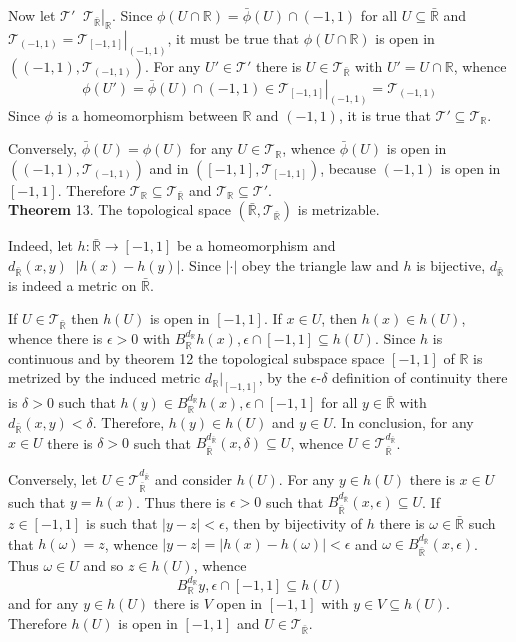 \documentclass[a4paper]{article}
\newcommand{\clo}[1]{\left [ #1 \right ]}
\newcommand{\brac}[1]{\left ( #1 \right )}
\newcommand{\induc}[1]{\left . #1 \right \vert}
\newcommand{\abs}[1]{\left | #1 \right |}
\newcommand{\Rbar}{{\bar{\mathbb{R}}}}
\newcommand{\Real}{\mathbb{R}}
\newcommand{\Tcal}{\mathcal{T}}
\newcommand{\defn}{\mathop{\overset{\Delta}{=}}\nolimits}
\begin{document}
Now let $\Tcal'\defn \induc{\Tcal_\Rbar}_\Real$. Since $\phi\brac{U\cap\Real}=\bar{\phi}\brac{U}\cap\brac{-1,1}$ for all $U\subseteq \Rbar$ and $\Tcal_{\brac{-1,1}}=\induc{\Tcal_{\clo{-1,1}}}_{\brac{-1,1}}$, it must be true that $\phi\brac{U\cap\Real}$ is open in $\brac{\brac{-1,1}, \Tcal_{\brac{-1,1}}}$. For any $U'\in\Tcal'$ there is $U\in \Tcal_\Rbar$ with $U'=U\cap \Real$, whence \[\phi\brac{U'}=\bar{\phi}\brac{U}\cap \brac{-1,1}\in\induc{\Tcal_{\clo{-1,1}}}_{\brac{-1,1}}=\Tcal_{\brac{-1,1}}\] Since $\phi$ is a homeomorphism between $\Real$ and $\brac{-1,1}$, it is true that $\Tcal'\subseteq \Tcal_\Real$.

Conversely, $\bar{\phi}\brac{U}=\phi\brac{U}$ for any $U\in\Tcal_\Real$, whence $\bar{\phi}\brac{U}$ is open in $\brac{\brac{-1,1}, \Tcal_{\brac{-1,1}}}$ and in $\brac{\clo{-1,1}, \Tcal_{\clo{-1,1}}}$, because $\brac{-1,1}$ is open in $\clo{-1,1}$. Therefore $\Tcal_\Real\subseteq \Tcal_\Rbar$ and $\Tcal_\Real\subseteq\Tcal'$.\\

\label{thm:t_rbar_metr} \noindent \textbf{Theorem} 13.
The topological space $\brac{\Rbar, \Tcal_\Rbar}$ is metrizable.

Indeed, let $h:\Rbar\to \clo{-1,1}$ be a homeomorphism and $d_\Rbar\brac{x,y}\defn \abs{h\brac{x}-h\brac{y}}$. Since $\abs{\cdot}$ obey the triangle law and $h$ is bijective, $d_\Rbar$ is indeed a metric on $\Rbar$.

If $U\in \Tcal_\Rbar$ then $h\brac{U}$ is open in $\clo{-1, 1}$. If $x\in U$, then $h\brac{x}\in h\brac{U}$, whence there is $\epsilon>0$ with $B_\Real^{d_\Real}{h\brac{x}, \epsilon}\cap \clo{-1,1}\subseteq h\brac{U}$. Since $h$ is continuous and by theorem 12 the topological subspace space $\clo{-1,1}$ of $\Real$ is metrized by the induced metric $\induc{d_\Real}_{\clo{-1,1}}$, by the $\epsilon$-$\delta$ definition of continuity there is $\delta>0$ such that $h\brac{y}\in B_\Real^{d_\Real}{h\brac{x}, \epsilon}\cap \clo{-1,1}$ for all $y\in \Rbar$ with $d_\Rbar\brac{x,y}<\delta$. Therefore, $h\brac{y}\in h\brac{U}$ and $y\in U$. In conclusion, for any $x\in U$ there is $\delta>0$ such that $B_\Rbar^{d_\Rbar}\brac{x, \delta}\subseteq U$, whence $U\in \Tcal_\Rbar^{d_\Rbar}$.

Conversely, let $U\in \Tcal_\Rbar^{d_\Rbar}$ and consider $h\brac{U}$. For any $y\in h\brac{U}$ there is $x\in U$ such that $y=h\brac{x}$. Thus there is $\epsilon>0$ such that $B_\Rbar^{d_\Rbar}\brac{x, \epsilon}\subseteq U$. If $z\in \clo{-1,1}$ is such that $\abs{y-z}<\epsilon$, then by bijectivity of $h$ there is $\omega\in \Rbar$ such that $h\brac{\omega}=z$, whence $\abs{y-z}=\abs{h\brac{x}-h\brac{\omega}}<\epsilon$ and $\omega\in B_\Rbar^{d_\Rbar}\brac{x, \epsilon}$. Thus $\omega\in U$ and so $z\in h\brac{U}$, whence \[B_\Real^{d_\Real}{y, \epsilon}\cap \clo{-1,1}\subseteq h\brac{U}\] and for any $y\in h\brac{U}$ there is $V$ open in $\clo{-1,1}$ with $y\in V\subseteq h\brac{U}$. Therefore $h\brac{U}$ is open in $\clo{-1,1}$ and $U\in \Tcal_\Rbar$.\\
\end{document}
